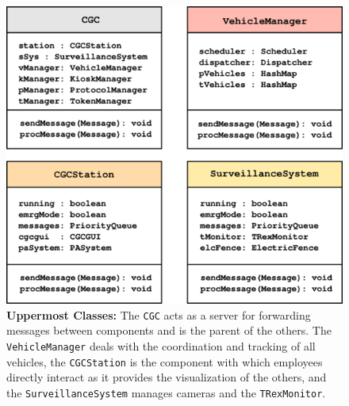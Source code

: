 \documentclass[12pt]{article}
\begin{document}
\begin{figure}[H]
    \centerline{\includegraphics[scale=0.75]{MainClasses1.png}}
    \caption{\textbf{Uppermost Classes:} The \texttt{CGC} acts as a server for forwarding messages between components and
    is the parent of the others. The \texttt{VehicleManager} deals with the coordination and tracking of all vehicles, the 
    \texttt{CGCStation} is the component with which employees directly interact as it provides the visualization of the others, 
    and the \texttt{SurveillanceSystem} manages cameras and the \texttt{TRexMonitor}.}
    \label{fig:mainclasses}
\end{figure}
\end{document}

